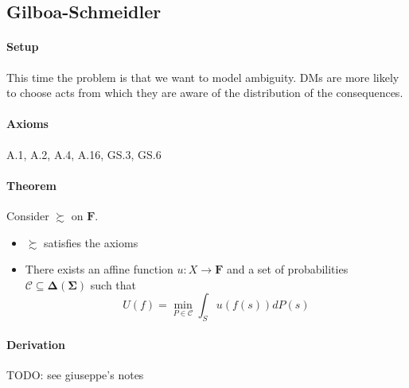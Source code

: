 \documentclass[landscape, 12pt]{extarticle}
\begin{document}
\begin{multicols}{2}
	\subsection{Gilboa-Schmeidler}

	\paragraph{Setup}
	This time the problem is that we want to model ambiguity.
	DMs are more likely to choose acts from which they are aware
	of the distribution of the consequences.

	\paragraph{Axioms} A.1, A.2, A.4, A.16, GS.3, GS.6

	\paragraph{Theorem}
	Consider $\succsim$ on $\bm F$.
	\begin{itemize}
		\item $\succsim$ satisfies the axioms
		\item There exists an affine function	$u: X \to \bm F$
		      and a set of probabilities $\mathcal C \subseteq \bm \Delta(\bm \Sigma)$
		      such that
		      \[
			      U(f) = \min_{P\in \mathcal C} \int_S u(f(s)) dP(s)
		      \]
	\end{itemize}

	\paragraph{Derivation}
	TODO: see giuseppe's notes
\end{multicols}
\end{document}

